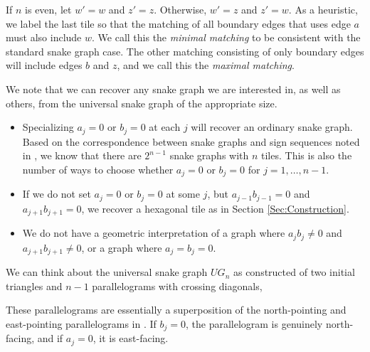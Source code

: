\documentclass[pdftex]{sigma}%
\numberwithin{equation}{section}
\begin{document}
If $n$ is even, let $w' = w$ and $z' = z$. Otherwise, $w' = z$ and $z' = w$. As a heuristic, we label the last tile so that the matching of all boundary edges that uses edge $a$ must also include $w$. We call this the \emph{minimal matching} to be consistent with the standard snake graph case. The other matching consisting of only boundary edges will include edges $b$ and $z$, and we call this the \emph{maximal matching}.


We note that we can recover any snake graph we are interested in, as well as others, from the universal snake graph of the appropriate size.
\begin{itemize}\itemsep=0pt
\item Specializing $a_j = 0$ or $b_j = 0$ at each $j$ will recover an ordinary snake graph. Based on the correspondence between snake graphs and sign sequences noted in \cite{Canakci-Schiffler}, we know that there are $2^{n-1}$ snake graphs with $n$ tiles. This is also the number of ways to choose whether $a_j = 0$ or $b_j = 0$ for $j = 1, \ldots, n-1$.
\item If we do not set $a_j = 0$ or $b_j = 0$ at some $j$, but $a_{j-1}b_{j-1} = 0$ and $a_{j+1}b_{j+1} = 0$, we recover a hexagonal tile as in Section \ref{Sec:Construction}.
\item We do not have a geometric interpretation of a graph where $a_jb_j \neq 0$ and $a_{j+1}b_{j+1} \neq 0$, or a graph where $a_j = b_j = 0$.
\end{itemize}

\begin{Remark}
We can think about the universal snake graph $UG_n$ as constructed of two initial triangles and $n-1$ parallelograms with crossing diagonals,
\begin{center}
\end{center}

These parallelograms are essentially a superposition of the north-pointing and east-pointing parallelograms in \cite{MW}. If $b_j = 0$, the parallelogram is genuinely north-facing, and if $a_j = 0$, it is east-facing.
\end{Remark}
\end{document}
